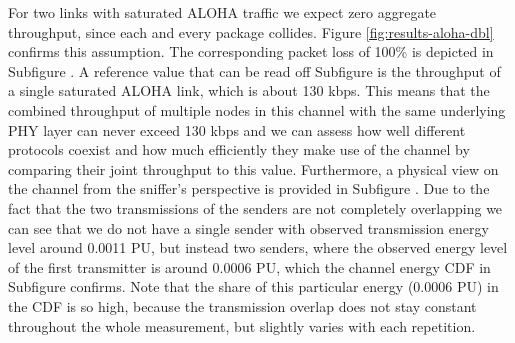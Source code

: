 For two links with saturated ALOHA traffic we expect zero aggregate throughput, since each and every package collides. Figure \ref{fig:results-aloha-dbl}  confirms this assumption. The corresponding packet loss of 100\% is depicted in Subfigure . A reference value that can be read off Subfigure  is the throughput of a single saturated ALOHA link, which is about 130 kbps. This means that the combined throughput of multiple nodes in this channel with the same underlying PHY layer can never exceed 130 kbps and we can assess how well different protocols coexist and how much efficiently they make use of the channel by comparing their joint throughput to this value. Furthermore, a physical view on the channel from the sniffer's perspective is provided in Subfigure . Due to the fact that the two transmissions of the senders are not completely overlapping we can see that we do not have a single sender with observed transmission energy level around 0.0011 PU, but instead two senders, where the observed energy level of the first transmitter is around 0.0006 PU, which the channel energy CDF in Subfigure  confirms. Note that the share of this particular energy (0.0006 PU) in the CDF is so high, because the transmission overlap does not stay constant throughout the whole measurement, but slightly varies with each repetition.
